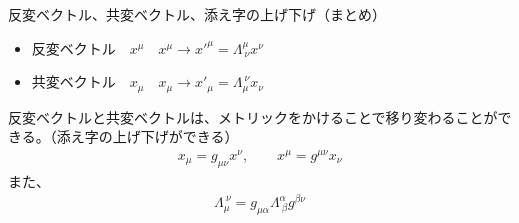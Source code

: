 \documentclass[10pt,a4paper]{jarticle}
\begin{document}
\begin{itembox}[l]{反変ベクトル、共変ベクトル、添え字の上げ下げ（まとめ）}

\begin{itemize}
\item 反変ベクトル　$x^\mu$　$x^\mu \to x'^\mu = \Lambda^\mu_{~\nu} x^\nu$
\item 共変ベクトル　$x_\mu$　$x_\mu \to x'_\mu = \Lambda_\mu^{~\nu} x_\nu$
\end{itemize}

反変ベクトルと共変ベクトルは、メトリックをかけることで移り変わることができる。（添え字の上げ下げができる）
\begin{align}
x_\mu = g_{\mu\nu} x^\nu, \qquad
x^\mu = g^{\mu\nu} x_\nu
\end{align}
また、
\begin{align}
\Lambda_\mu^{~\nu} = g_{\mu\alpha} \Lambda^\alpha_{~\beta} g^{\beta\nu}
\end{align}

\end{itembox}
\end{document}
